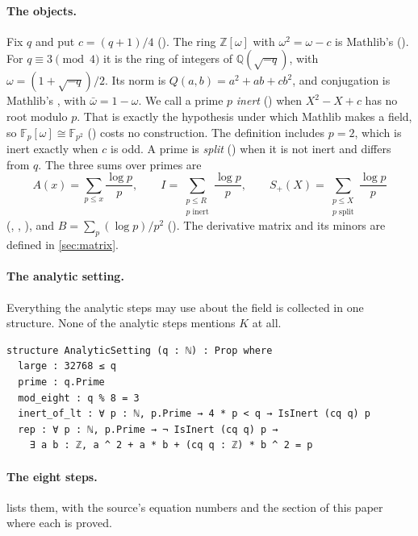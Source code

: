 \documentclass[11pt]{article}
\theoremstyle{definition}
\newcommand{\Z}{\mathbb{Z}}
\newcommand{\Q}{\mathbb{Q}}
\begin{document}
\paragraph{The objects.} Fix $q$ and put $c = (q+1)/4$ (). The ring $\Z[\omega]$ with $\omega^2 = \omega - c$ is Mathlib's  (). For $q \equiv 3 \pmod 4$ it is the ring of integers of $\Q(\sqrt{-q})$, with $\omega = (1 + \sqrt{-q})/2$. Its norm is $Q(a, b) = a^2 + ab + cb^2$, and conjugation is Mathlib's , with $\bar\omega = 1 - \omega$. We call a prime $p$ \emph{inert} () when $X^2 - X + c$ has no root modulo $p$. That is exactly the hypothesis under which Mathlib makes  a field, so $\mathbb F_p[\omega] \cong \mathbb F_{p^2}$ () costs no construction. The definition includes $p = 2$, which is inert exactly when $c$ is odd. A prime is \emph{split} () when it is not inert and differs from $q$. The three sums over primes are
\[
A(x) = \sum_{p \le x} \frac{\log p}{p}, \qquad I = \sum_{\substack{p \le R\\ p \text{ inert}}} \frac{\log p}{p}, \qquad S_+(X) = \sum_{\substack{p \le X\\ p \text{ split}}} \frac{\log p}{p}
\]
(, , ), and $B = \sum_p (\log p)/p^2$ (). The derivative matrix and its minors are defined in \cref{sec:matrix}.

\paragraph{The analytic setting.} Everything the analytic steps may use about the field is collected in one structure. None of the analytic steps mentions $K$ at all.

\begin{lstlisting}
structure AnalyticSetting (q : ℕ) : Prop where
  large : 32768 ≤ q
  prime : q.Prime
  mod_eight : q % 8 = 3
  inert_of_lt : ∀ p : ℕ, p.Prime → 4 * p < q → IsInert (cq q) p
  rep : ∀ p : ℕ, p.Prime → ¬ IsInert (cq q) p →
    ∃ a b : ℤ, a ^ 2 + a * b + (cq q : ℤ) * b ^ 2 = p
\end{lstlisting}

\paragraph{The eight steps.}  lists them, with the source's equation numbers and the section of this paper where each is proved.
\end{document}
